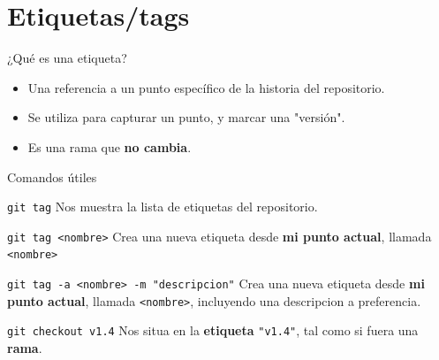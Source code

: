 \documentclass{beamer}
\begin{document}
    \section{Etiquetas/tags}
    \begin{frame}{¿Qué es una etiqueta?}
    \pause
        \begin{itemize}
            \item Una referencia a un punto específico de la historia del repositorio.\pause
            \item Se utiliza para capturar un punto, y marcar una "versión".\pause
            \item Es una rama que \textbf{no cambia}.
        \end{itemize}
    \end{frame}
    \begin{frame}{Comandos útiles}
        \begin{block}{\texttt{git tag}}
            Nos muestra la lista de etiquetas del repositorio.
        \end{block}\pause
        \begin{block}{\texttt{git tag <nombre>}}
            Crea una nueva etiqueta desde \textbf{mi punto actual}, llamada \texttt{<nombre>}
        \end{block}\pause
        \begin{block}{\texttt{git tag -a <nombre> -m "descripcion"}}
            Crea una nueva etiqueta desde \textbf{mi punto actual}, llamada \texttt{<nombre>}, incluyendo una descripcion a preferencia.
        \end{block}\pause
        \begin{block}{\texttt{git checkout v1.4}}
            Nos situa en la \textbf{etiqueta} \texttt{"v1.4"}, tal como si fuera una \textbf{rama}.
        \end{block}
    \end{frame}
    
\end{document}
